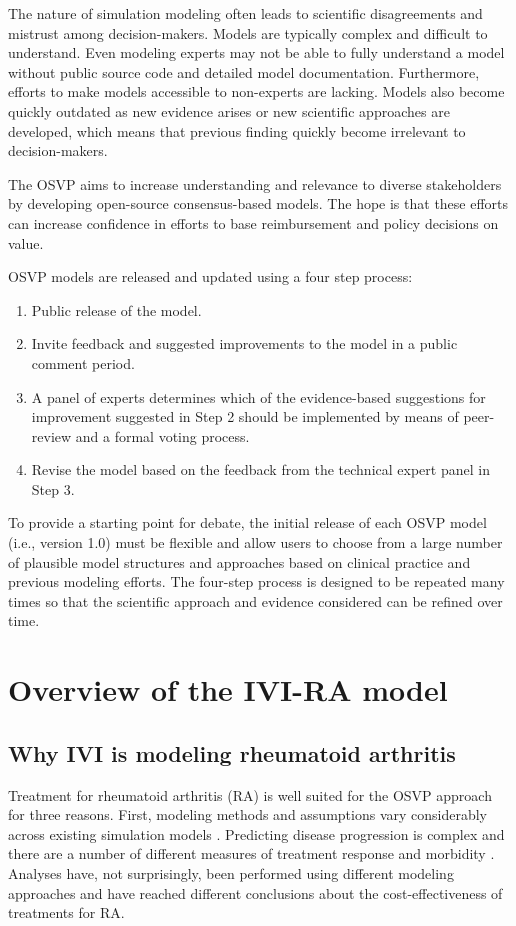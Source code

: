 \documentclass[11pt,final,fleqn]{article}\usepackage[]{graphicx}\usepackage[]{color}
\theoremstyle{plain}
\begin{document}
The nature of simulation modeling often leads to scientific disagreements and mistrust among decision-makers. Models are typically complex and difficult to understand. Even modeling experts may not be able to fully understand a model without public source code and detailed model documentation. Furthermore, efforts to make models accessible to non-experts are lacking. Models also become quickly outdated as new evidence arises or new scientific approaches are developed, which means that previous finding quickly become irrelevant to decision-makers.

The OSVP aims to increase understanding and relevance to diverse stakeholders by developing open-source consensus-based models. The hope is that these efforts can increase confidence in efforts to base reimbursement and policy decisions on value.

OSVP models are released and updated using a four step process:

\begin{enumerate}
\item Public release of the model.
\item Invite feedback and suggested improvements to the model in a public comment period.
\item A panel of experts determines which of the evidence-based suggestions for improvement suggested in Step 2 should be implemented by means of peer-review and a formal voting process. 
\item Revise the model based on the feedback from the technical expert panel in Step 3. 
\end{enumerate}

To provide a starting point for debate, the initial release of each OSVP model (i.e., version 1.0) must be flexible and allow users to choose from a large number of plausible model structures and approaches based on clinical practice and previous modeling efforts. The four-step process is designed to be repeated many times so that the scientific approach and evidence considered can be refined over time.

\section{Overview of the IVI-RA model}\label{sec:overview-ra}

\subsection{Why IVI is modeling rheumatoid arthritis}
Treatment for rheumatoid arthritis (RA) is well suited for the OSVP approach for three reasons. First, modeling methods and assumptions vary considerably across existing simulation models  \citep{brennan2003modelling, wailoo2008biologic, tosh2011sheffield, carlson2015economic, stephens2015modelling, athanasakis2015cost, stevenson2016adalimumab, icer2017tim, stevenson2017cost}. Predicting disease progression is complex and there are a number of different measures of treatment response and morbidity \citep{madan2015consensus}. Analyses have, not surprisingly, been performed using different modeling approaches and have reached different conclusions about the cost-effectiveness of treatments for RA. 
\end{document}
